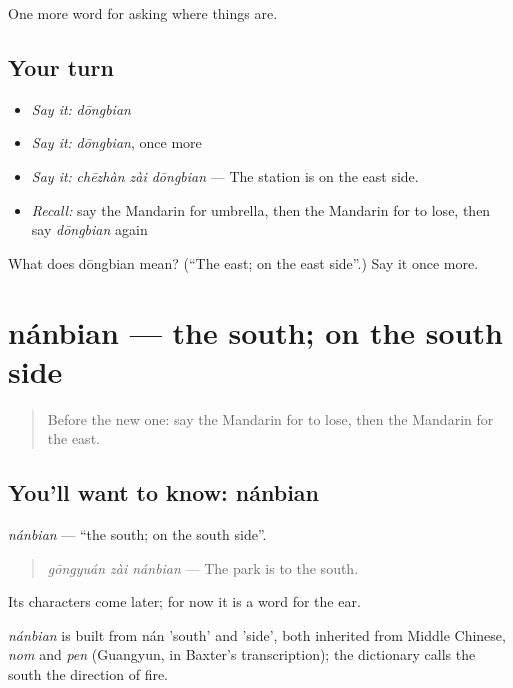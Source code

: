 \begin{grammarlens}[title={What you've built}]
One more word for asking where things are.
\end{grammarlens}

\subsection*{Your turn}
\begin{itemize}
\raggedright
  \item \emph{Say it:} \emph{dōngbian}
  \item \emph{Say it:} \emph{dōngbian}, once more
  \item \emph{Say it:} \emph{chēzhàn zài dōngbian} — The station is on the east side.
  \item \emph{Recall:} say the Mandarin for umbrella, then the Mandarin for to lose, then say \emph{dōngbian} again
\end{itemize}

\begin{tcolorbox}[breakable,colback=teal!4,colframe=teal!35!black,title={Before you move on}]
What does dōngbian mean? (\textquotedblleft{}The east; on the east side\textquotedblright{}.) Say it once more.
\end{tcolorbox}
\section[nánbian]{nánbian — the south; on the south side}

\label{lesson:ZH-C117-nanbian}



\begin{quote}
Before the new one: say the Mandarin for to lose, then the Mandarin for the east.
\end{quote}

\subsection*{You'll want to know: nánbian}
\emph{nánbian} — \textquotedblleft{}the south; on the south side\textquotedblright{}.

\begin{quote}
\emph{gōngyuán zài nánbian} — The park is to the south.
\end{quote}

Its characters come later; for now it is a word for the ear.

\begin{cousinweb}
\emph{nánbian} is built from nán 'south' and  'side', both inherited from Middle Chinese, \emph{nom} and \emph{pen} (Guangyun, in Baxter's transcription); the dictionary calls the south the direction of fire.
\end{cousinweb}

